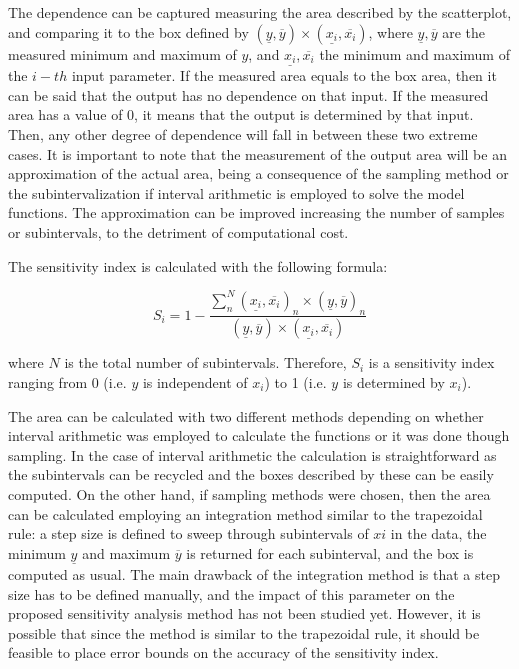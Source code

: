 \documentclass[twocolumn]{rps-esrel2022}
\begin{document}
The dependence can be captured measuring the area described by the scatterplot, and comparing it to the box defined by $(\underline{y},\overline{y})\times(\underline{x_i},\overline{x_i})$,
where $\underline{y},\overline{y}$ are the measured minimum and maximum of $y$, and $\underline{x_i},\overline{x_i}$ the minimum and maximum of the $i-th$ input parameter.
If the measured area equals to the box area, then it can be said that the output has no dependence on that input.
If the measured area has a value of 0, it means that the output is determined by that input.
Then, any other degree of dependence will fall in between these two extreme cases.
It is important to note that the measurement of the output area will be an approximation of the actual area, being a consequence of the sampling method or the subintervalization
if interval arithmetic is employed to solve the model functions.
The approximation can be improved increasing the number of samples or subintervals, to the detriment of computational cost.

The sensitivity index is calculated with the following formula:

\begin{equation}
	S_i = 1 - \frac{\sum_n^N(\underline{x_i},\overline{x_i})_n\times(\underline{y},\overline{y})_n}{(\underline{y},\overline{y})\times(\underline{x_i},\overline{x_i})}
\end{equation}

where $N$ is the total number of subintervals.
Therefore, $S_i$ is a sensitivity index ranging from 0 (i.e. $y$ is independent of $x_i$) to 1 (i.e. $y$ is determined by $x_i$).

The area can be calculated with two different methods depending on whether interval arithmetic was employed to calculate the functions or it was done though sampling.
In the case of interval arithmetic the calculation is straightforward as the subintervals can be recycled and the boxes described by these can be easily computed.
On the other hand, if sampling methods were chosen, then the area can be calculated employing an integration method similar to the trapezoidal rule: a step size is defined to
sweep through subintervals of $xi$ in the data, the minimum $\underline{y}$ and maximum $\overline{y}$ is returned for each subinterval, and the box is computed as usual.
The main drawback of the integration method is that a step size has to be defined manually, and the impact of this parameter on the proposed sensitivity analysis method has not
been studied yet.
However, it is possible that since the method is similar to the trapezoidal rule, it should be feasible to place error bounds on the accuracy of the sensitivity index.
\end{document}
